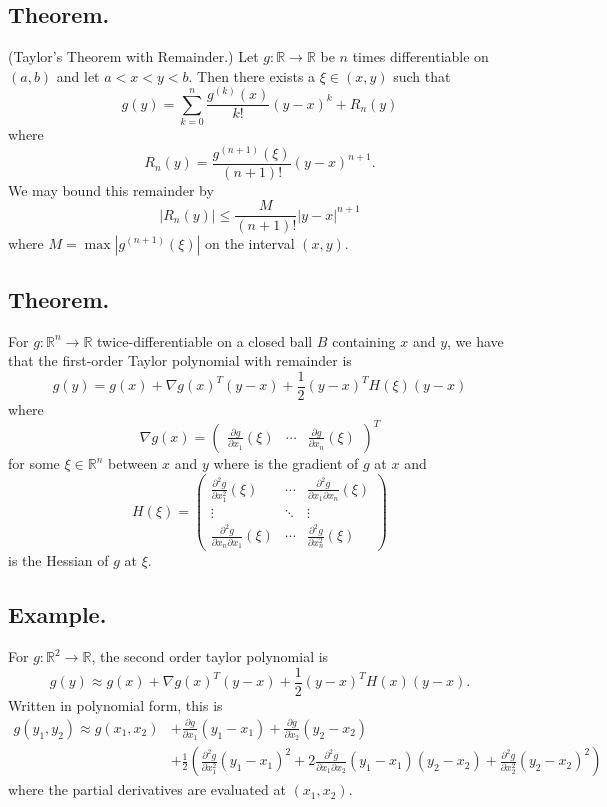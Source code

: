 \documentclass[titlepage]{article}
\begin{document}
\subsection{Theorem.} (Taylor's Theorem with Remainder.) 
Let $g: \mathbb{R} \to \mathbb{R}$ be $n$ times differentiable on $(a, b)$ and let $a < x < y < b$. Then there exists a $\xi \in (x, y)$ such that 
$$g(y) = \sum_{k=0}^{n}\frac{g^{(k)}(x)}{k!}(y-x)^{k} + R_{n}(y)$$
where
$$R_{n}(y) = \frac{g^{(n+1)}(\xi)}{(n+1)!}(y-x)^{n+1}.$$
We may bound this remainder by 
$$|R_{n}(y)| \leq \frac{M}{(n+1)!}|y-x|^{n+1}$$
where $M = \max|g^{(n+1)}(\xi)|$ on the interval $(x, y)$.

\subsection{Theorem.} For $g: \mathbb{R}^{n} \to \mathbb{R}$ twice-differentiable on a closed ball $B$ containing $x$ and $y$, we have that the first-order Taylor polynomial with remainder is 
$$g(y) = g(x) + \nabla g(x)^{T}(y-x) + \frac{1}{2}(y-x)^{T}H(\xi)(y-x)$$
where 
$$\nabla g(x) = \begin{pmatrix} \frac{\partial g}{\partial x_{1}}(\xi) & \cdots & \frac{\partial g}{\partial x_{n}}(\xi) \end{pmatrix}^{T}$$
for some $\xi \in \mathbb{R}^{n}$ between $x$ and $y$ where is the gradient of $g$ at $x$ and 
$$H(\xi) = \begin{pmatrix} \frac{\partial^{2} g}{\partial x_{1}^{2}}(\xi) & \cdots & \frac{\partial^{2} g}{\partial x_{1}\partial x_{n}}(\xi) \\ \vdots & \ddots & \vdots \\ \frac{\partial^{2} g}{\partial x_{n}\partial x_{1}}(\xi) & \cdots & \frac{\partial^{2} g}{\partial x_{n}^{2}}(\xi) \end{pmatrix}$$
is the Hessian of $g$ at $\xi$.

\subsection{Example.} For $g: \mathbb{R}^{2} \to \mathbb{R}$, the second order taylor polynomial is 
$$g(y) \approx g(x) + \nabla g(x)^{T}(y-x) + \frac{1}{2}(y-x)^{T}H(x)(y-x).$$
Written in polynomial form, this is 
\begin{align*}
    g(y_{1}, y_{2}) \approx g(x_{1}, x_{2}) &+ \frac{\partial g}{\partial x_{1}}(y_{1}-x_{1}) + \frac{\partial g}{\partial x_{2}}(y_{2}-x_{2}) \\
                                            &+ \frac{1}{2}\left(\frac{\partial^{2} g}{\partial x_{1}^{2}}(y_{1}-x_{1})^{2} + 2\frac{\partial^{2} g}{\partial x_{1}\partial x_{2}}(y_{1}-x_{1})(y_{2}-x_{2}) + \frac{\partial^{2} g}{\partial x_{2}^{2}}(y_{2}-x_{2})^{2}\right)
\end{align*}
where the partial derivatives are evaluated at $(x_{1}, x_{2})$.
\end{document}
